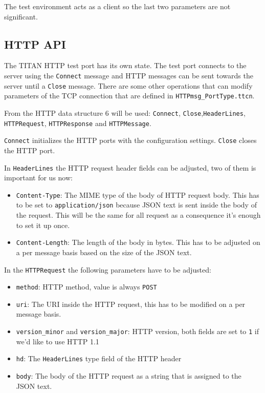 \documentclass[a4paper]{article}
\begin{document}
The test environment acts as a client so the last two parameters are not significant.

\subsection{HTTP API}
The TITAN HTTP test port has its own state. The test port connects to the server using the \verb!Connect!
message and HTTP messages can be sent towards the server until a \verb!Close! message. There are some
other operations that can modify parameters of the TCP connection that are defined in \verb/HTTPmsg_PortType.ttcn/.

From the HTTP data structure 6 will be used: \verb/Connect/,
\verb!Close!,\verb/HeaderLines/,
\verb/HTTPRequest/, \verb!HTTPResponse! and \verb!HTTPMessage!.

\verb/Connect/ initializes the HTTP ports with the configuration settings. \verb!Close!
closes the HTTP port.

In \verb/HeaderLines/ the HTTP request header fields can be adjusted, two of them is important for us now:
\begin{itemize}
    \item \verb!Content-Type!:  The MIME type of the body of HTTP request body. This has to be set to
          \verb!application/json! because JSON text is sent inside the body of the request. This will be the same for all
          request as a consequence it's enough to set it up once.
    \item \verb!Content-Length!: The length of the body in bytes. This has to be adjusted on a per message basis
          based on the size of the JSON text.
\end{itemize}

In the \verb/HTTPRequest/ the following parameters have to be adjusted:
\begin{itemize}
    \item \verb!method!: HTTP method, value is always \verb'POST'
    \item \verb'uri': The URI inside the HTTP request, this has to be modified on a per message basis.
    \item \verb!version_minor! and \verb!version_major!: HTTP version, both fields are set to
          \verb!1! if we'd like to use HTTP 1.1
    \item \verb!hd!: The \verb/HeaderLines/ type field of the HTTP header
    \item \verb!body!: The body of the HTTP request as a string that is assigned to the JSON text.
\end{itemize}
\end{document}
